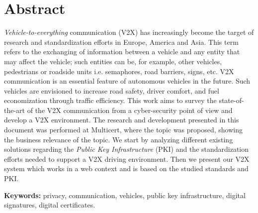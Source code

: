 
\section*{Abstract}


\textit{Vehicle-to-everything} communication (V2X) has increasingly become the target of research and standardization efforts in Europe, America and Asia. This term refers to the exchanging of information between a vehicle and any entity that may affect the vehicle; such entities can be, for example, other vehicles, pedestrians or roadside units i.e. semaphores, road barriers, signs, etc. V2X communication is an essential feature of autonomous vehicles in the future. Such vehicles are envisioned to increase road safety, driver comfort, and fuel economization through traffic efficiency. This work aims to survey the state-of-the-art of the V2X communication from a cyber-security point of view and develop a V2X environment. The research and development presented in this document was performed at Multicert, where the topic was proposed, showing the business relevance of the topic. We start by analyzing different existing solutions regarding the \textit{Public Key Infrastructure} (PKI) and the standardization efforts needed to support a V2X driving environment. Then we present our V2X system which works in a web context and is based on the studied standards and PKI.

\vfill

\textbf{\Large Keywords:} privacy, communication, vehicles, public key infrastructure, digital signatures, digital certificates.

